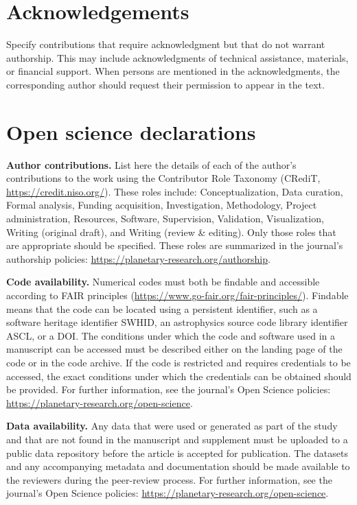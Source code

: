 \documentclass[article,review]{planetary}
\begin{document}
\section*{Acknowledgements}
Specify contributions that require acknowledgment but that do not warrant authorship. This may include acknowledgments of technical assistance, materials, or financial support. When persons are mentioned in the acknowledgments, the corresponding author should request their permission to appear in the text.

\section*{Open science declarations}

\noindent\textbf{Author contributions.} List here the details of each of the author's contributions to the work using the Contributor Role Taxonomy (CRediT, \href{https://credit.niso.org/}{https://credit.niso.org/}). These roles include: Conceptualization, Data curation, Formal analysis, Funding acquisition, Investigation, Methodology, Project administration, Resources, Software, Supervision, Validation, Visualization, Writing (original draft), and Writing (review \& editing). Only those roles that are appropriate should be specified. These roles are summarized in the journal's authorship policies: \href{https://planetary-research.org/authorship}{https://planetary-research.org/authorship}.

\noindent\textbf{Code availability.} Numerical codes must both be findable and accessible according to FAIR principles (\href{https://www.go-fair.org/fair-principles/}{https://www.go-fair.org/fair-principles/}). Findable means that the code can be located using a persistent identifier, such as a software heritage identifier SWHID, an astrophysics source code library identifier ASCL, or a DOI. The conditions under which the code and software used in a manuscript can be accessed must be described either on the landing page of the code or in the code archive. If the code is restricted and requires credentials to be accessed, the exact conditions under which the credentials can be obtained should be provided. For further information, see the journal's Open Science policies: \href{https://planetary-research.org/open-science}{https://planetary-research.org/open-science}.

\noindent\textbf{Data availability.} Any data that were used or generated as part of the study and that are not found in the manuscript and supplement must be uploaded to a public data repository before the article is accepted for publication. The datasets and any accompanying metadata and documentation should be made available to the reviewers during the peer-review process. For further information, see the journal's Open Science policies: \href{https://planetary-research.org/open-science}{https://planetary-research.org/open-science}.
\end{document}
